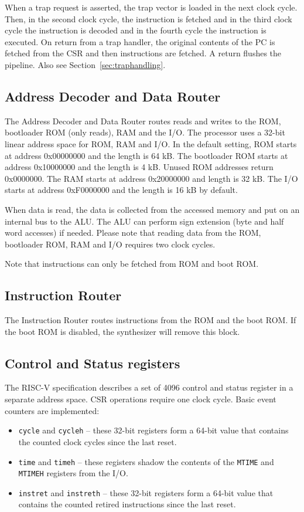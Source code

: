 \documentclass[12pt]{article}
\begin{document}
When a trap request is asserted, the trap vector is loaded in the next clock cycle. Then, in the second clock cycle, the instruction is fetched and in the third clock cycle the instruction is decoded and in the fourth cycle the instruction is executed. On return from a trap handler, the original contents of the PC is fetched from the CSR and then instructions are fetched. A return flushes the pipeline. Also see Section~\ref{sec:traphandling}.


\subsection{Address Decoder and Data Router}
\label{sec:addressdecoderanddatarouter}
The Address Decoder and Data Router routes reads and writes to the ROM, bootloader ROM (only reads), RAM and the I/O. The processor uses a 32-bit linear address space for ROM, RAM and I/O. In the default setting, ROM starts at address 0x00000000 and the length is 64 kB. The bootloader ROM starts at address 0x10000000 and the length is 4 kB. Unused ROM addresses return 0x0000000. The RAM starts at address 0x20000000 and length is 32 kB. The I/O starts at address 0xF0000000 and the length is 16 kB by default.

When data is read, the data is collected from the accessed memory and put on an internal bus to the ALU. The ALU can perform sign extension (byte and half word accesses) if needed. Please note that reading data from the ROM, bootloader ROM, RAM and I/O requires two clock cycles.

Note that instructions can only be fetched from ROM and boot ROM.

\subsection{Instruction Router}
The Instruction Router routes instructions from the ROM and the boot ROM. If the boot ROM is disabled, the synthesizer will remove this block.

\subsection{Control and Status registers}
The RISC-V specification describes a set of 4096 control and status register in a separate address space. CSR operations require one clock cycle. Basic event counters are implemented:

\begin{itemize}
\item \lstinline|cycle| and \lstinline|cycleh| -- these 32-bit registers form a 64-bit value that contains the counted clock cycles since the last reset.
\item \lstinline|time| and \lstinline|timeh| -- these registers shadow the contents of the \lstinline|MTIME| and \lstinline|MTIMEH| registers from the I/O.
\item \lstinline|instret| and \lstinline|instreth| -- these 32-bit registers form a 64-bit value that contains the counted retired instructions since the last reset.
\end{itemize}
\end{document}
